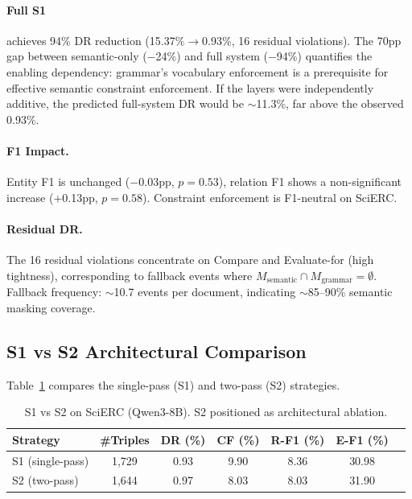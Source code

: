 \documentclass[11pt,a4paper]{article}
\begin{document}
\paragraph{Full S1} achieves 94\% DR reduction (15.37\%$\to$0.93\%, 16 residual violations). The 70pp gap between semantic-only ($-$24\%) and full system ($-$94\%) quantifies the enabling dependency: grammar's vocabulary enforcement is a prerequisite for effective semantic constraint enforcement. If the layers were independently additive, the predicted full-system DR would be $\sim$11.3\%, far above the observed 0.93\%.

\paragraph{F1 Impact.} Entity F1 is unchanged ($-$0.03pp, $p{=}0.53$), relation F1 shows a non-significant increase ($+$0.13pp, $p{=}0.58$). Constraint enforcement is F1-neutral on SciERC.

\paragraph{Residual DR.} The 16 residual violations concentrate on Compare and Evaluate-for (high tightness), corresponding to fallback events where $M_{\text{semantic}} \cap M_{\text{grammar}} = \emptyset$. Fallback frequency: $\sim$10.7 events per document, indicating $\sim$85--90\% semantic masking coverage.

\subsection{S1 vs S2 Architectural Comparison}
\label{sec:s1-vs-s2}

Table~\ref{tab:s1-vs-s2} compares the single-pass (S1) and two-pass (S2) strategies.

\begin{table}[t]
\centering
\small
\caption{S1 vs S2 on SciERC (Qwen3-8B). S2 positioned as architectural ablation.}
\label{tab:s1-vs-s2}
\begin{tabular}{lcccccc}
\toprule
\textbf{Strategy} & \textbf{\#Triples} & \textbf{DR (\%)} & \textbf{CF (\%)} & \textbf{R-F1 (\%)} & \textbf{E-F1 (\%)} \\
\midrule
S1 (single-pass) & 1,729 & 0.93 & 9.90 & 8.36 & 30.98 \\
S2 (two-pass) & 1,644 & 0.97 & 8.03 & 8.03 & 31.90 \\
\bottomrule
\end{tabular}
\end{table}
\end{document}
